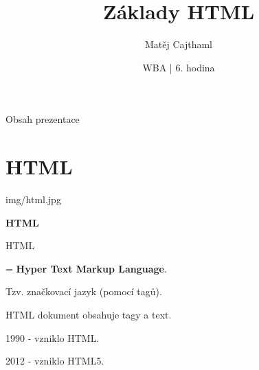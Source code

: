 \documentclass[aspectratio=169]{beamer}
\title{Základy HTML}
\date{WBA | 6. hodina}
\author[Cajthaml]{Matěj Cajthaml}
\begin{document}
\begin{frame}
\titlepage
\end{frame}

\begin{frame}{Obsah prezentace}
    \begin{cardTiny}
        \begin{minipage}{\textwidth}
            \vspace{1ex}
            \tableofcontents
        \end{minipage}
    \end{cardTiny}
\end{frame}



\section{HTML}

\begin{frameImg}[width]{img/html.jpg}
    \vspace*{60mm}
    \begin{cardTiny}
        \vspace*{\fill}
        \begin{center}
            \textbf{HTML}
        \end{center}
    \end{cardTiny}
\end{frameImg}

\begin{frame}{HTML}
    \begin{cardTiny}
        = \textbf{Hyper Text Markup Language}.

        Tzv. značkovací jazyk (pomocí tagů).

        HTML dokument obsahuje tagy a text.

        \vspace{2ex}

        1990 - vzniklo HTML.

        2012 - vzniklo HTML5.
    \end{cardTiny}
\end{frame}
\end{document}
